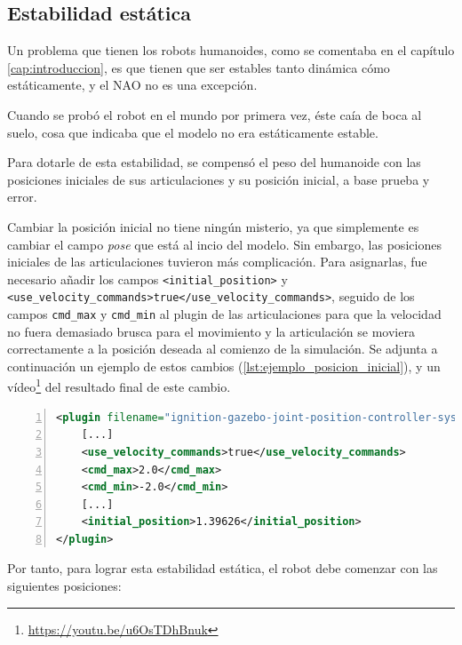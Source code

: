 \subsection{Estabilidad estática}

Un problema que tienen los robots humanoides, como se comentaba en el capítulo \ref{cap:introduccion}, es que tienen que ser estables tanto dinámica cómo estáticamente, y el NAO no es una excepción.

Cuando se probó el robot en el mundo por primera vez, éste caía de boca al suelo, cosa que indicaba que el modelo no era estáticamente estable.

Para dotarle de esta estabilidad, se compensó el peso del humanoide con las posiciones iniciales de sus articulaciones y su posición inicial, a base prueba y error.

Cambiar la posición inicial no tiene ningún misterio, ya que simplemente es cambiar el campo \textit{pose} que está al incio del modelo. Sin embargo, las posiciones iniciales de las articulaciones tuvieron más complicación. Para asignarlas, fue necesario añadir los campos \texttt{<initial\_position>} y \texttt{<use\_velocity\_commands>true</use\_velocity\_commands>}, seguido de los campos \texttt{cmd\_max} y \texttt{cmd\_min} al plugin de las articulaciones para que la velocidad no fuera demasiado brusca para el movimiento y la articulación se moviera correctamente a la posición deseada al comienzo de la simulación. Se adjunta a continuación un ejemplo de estos cambios (\autoref{lst:ejemplo_posicion_inicial}), y un vídeo\footnote{\url{https://youtu.be/u6OsTDhBnuk}} del resultado final de este cambio.  

\begin{lstlisting}[language=XML, caption={Ejemplo de configuración de posición inicial de una articulación}, label={lst:ejemplo_posicion_inicial}, numbers=left, backgroundcolor=\color{gray!10}]    
<plugin filename="ignition-gazebo-joint-position-controller-system" name="ignition::gazebo::systems::JointPositionController">
    [...]
    <use_velocity_commands>true</use_velocity_commands>
    <cmd_max>2.0</cmd_max>
    <cmd_min>-2.0</cmd_min>
    [...]
    <initial_position>1.39626</initial_position>
</plugin>
\end{lstlisting}

Por tanto, para lograr esta estabilidad estática, el robot debe comenzar con las siguientes posiciones:

